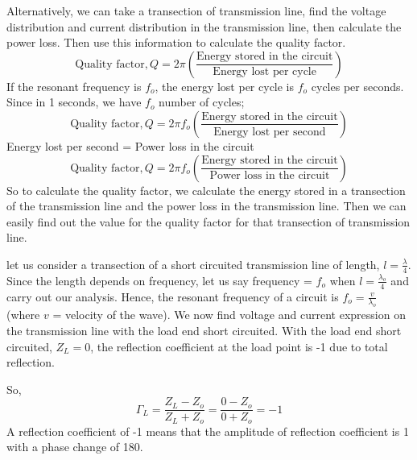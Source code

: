 Alternatively, we can take a transection of transmission line, find the voltage distribution and current distribution in the transmission line, then calculate the power loss. Then use this information to calculate the quality factor.
\begin{dmath*}
\text{Quality factor},Q 
=2\pi\left(\frac{\text{Energy stored in the circuit}}{\text{Energy lost per cycle}}\right) 
\end{dmath*} 
If the resonant frequency is $ f_{o} $, the energy lost per cycle is $ f_{o} $ cycles per seconds. Since in 1 seconds, we have $ f_{o} $ number of cycles;
\begin{dmath*}
\text{Quality factor}, Q = 2\pi f_{o}\left(\frac{\text{Energy stored in the circuit}}{\text{Energy lost per second}}\right)
\end{dmath*}
Energy lost per second = Power loss in the circuit 
\begin{dmath*}
\text{Quality factor}, Q=2 \pi f_{o}\left(\frac{\text{Energy stored in the circuit}}{\text{Power loss in the circuit}}\right)
\end{dmath*}
So to calculate the quality factor, we calculate the energy stored in a transection of the transmission line and the power loss in the transmission line. Then we can easily find out the value for the quality factor for that transection of transmission line.

let us consider a transection of a short circuited transmission line of length, $ l=\frac{\lambda}{4} $. Since the length depends on frequency, let us say frequency = $ f_{o} $ when $ l=\frac{\lambda_{o}}{4}$ and carry out our analysis. Hence, the resonant frequency of a circuit is $ f_{o} =\frac{v}{\lambda_{o}}$ (where $v$ = velocity of the wave). We now find voltage and current expression on the transmission line with the load end short circuited. With the load end short circuited, $Z_{L}= 0$, the reflection coefficient at the load point is -1 due to total reflection.

So,
\[\Gamma_{L} = \frac{Z_{L} - Z_{o}}{Z_{L} + Z_{o}} = \frac{0 - Z_{o}}{0 + Z_{o}} = -1\]
A reflection coefficient of -1 means that the amplitude of reflection coefficient is 1 with a phase change of 180\textdegree.

